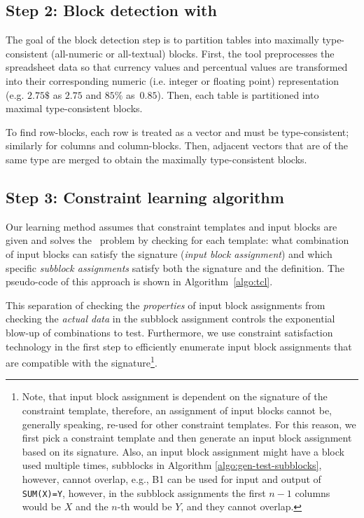 \subsection{Step 2: Block detection with \ecblockdetect} \label{sec:make_groups}
The goal of the block detection step is to partition tables into maximally type-consistent (all-numeric or all-textual) blocks.
First, the \added{\ecblockdetect{}} tool preprocesses the spreadsheet data so that currency values and percentual values are transformed into their corresponding numeric (i.e. integer or floating point) representation (e.g. $2.75 \$$ as $2.75$ and $85\%$ as~$0.85$).
Then, each table is partitioned into maximal type-consistent blocks.

To find row-blocks, each row is treated as a vector and must be type-consistent; similarly for columns and column-blocks.
Then, adjacent vectors that are of the same type are merged to obtain the maximally type-consistent blocks.


\subsection{Step 3: Constraint learning algorithm}
\label{sec:algo}
Our learning method assumes that constraint templates and input blocks are given and solves the \tcl~problem by checking for each template: what combination of input blocks can satisfy the signature (\textit{input block assignment}) and which specific \textit{subblock assignments} satisfy both the signature and the definition.
The pseudo-code of this approach is shown in Algorithm~\ref{algo:tcl}.


This separation of checking the \textit{properties} of input block assignments from checking the \textit{actual data} in the subblock assignment controls the exponential blow-up of combinations to test. Furthermore, we use constraint satisfaction technology in the first step to efficiently enumerate input block assignments that are compatible with the signature\pubrev\footnote{Note, that input block assignment is dependent on the signature of the constraint template, therefore, an assignment of input blocks cannot be, generally speaking, re-used for other constraint templates. For this reason, we first pick a constraint template and then generate an input block assignment based on its signature. Also, an input block assignment might have a block used multiple times, subblocks in Algorithm \ref{algo:gen-test-subblocks}, however, cannot overlap, e.g., B1 can be used for input and output of \texttt{SUM(X)=Y}, however, in the subblock assignments the first $n-1$ columns would be $X$ and the $n$-th would be $Y$, and they cannot overlap.}\pubrevend. %

